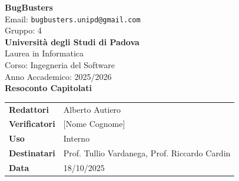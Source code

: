 \documentclass[a4paper,12pt]{article}
\begin{document}
\begin{center}
  {\Large\bfseries\color{primaryblue} BugBusters}\\[0.3cm]
  {\small\color{darkgray} Email: \texttt{bugbusters.unipd@gmail.com}} \\[0.1cm]
  {\small\color{darkgray} Gruppo: 4} \\[0.5cm]

  {\large\bfseries Università degli Studi di Padova}\\[0.3cm]
  {\small Laurea in Informatica}\\[0.2cm]
  {\small Corso: Ingegneria del Software}\\[0.2cm]
  {\small Anno Accademico: 2025/2026}\\[0.8cm]

  {\Huge\bfseries\color{primaryblue} Resoconto Capitolati}\\[0.8cm]
\end{center}

\begin{center}
\begin{tcolorbox}[colback=lightgray,colframe=primaryblue,width=0.85\textwidth,arc=3mm,boxrule=0.5pt]
\begin{tabular}{@{}ll@{}}
\textbf{Redattori}    & Alberto Autiero \\
\textbf{Verificatori} & [Nome Cognome] \\
\textbf{Uso}          & Interno \\
\textbf{Destinatari}  & Prof. Tullio Vardanega, Prof. Riccardo Cardin \\
\textbf{Data}         & 18/10/2025 \\
\end{tabular}
\end{tcolorbox}
\end{center}

\vspace{0.5cm}
\end{document}
